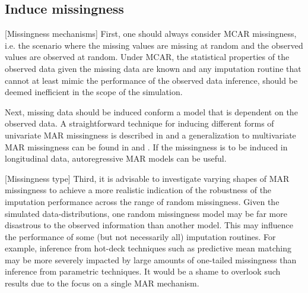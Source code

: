 \documentclass[bimj,fleqn]{w-art}
\theoremstyle{plain}
\theoremstyle{definition}
\begin{document}

\subsection{Induce missingness}


[Missingness mechanisms]
First, one should always consider MCAR missingness, i.e. the scenario where the missing values are missing at random and the observed values are observed at random. Under MCAR, the statistical properties of the observed data given the missing data are known and any imputation routine that cannot at least mimic the performance of the observed data inference, should be deemed inefficient in the scope of the simulation. 

Next, missing data should be induced conform a model that is dependent on the observed data. A straightforward technique for inducing different forms of univariate MAR missingness is described in \citet[][p. 63]{fimd} and a generalization to multivariate MAR missingness can be found in \citet[][Appendix B]{buur06} and \citet[][\S 5.2.3]{brand1999development}. If the missingness is to be induced in longitudinal data, autoregressive MAR models \citep[e.g. cf.][model 2 and model 3]{shara2015randomly} can be useful.

[Missingness type]
Third, it is advisable to investigate varying shapes of MAR missingness to achieve a more realistic indication of the robustness of the imputation performance across the range of random missingness. Given the simulated data-distributions, one random missingness model may be far more disastrous to the observed information than another model. This may influence the performance of some (but not necessarily all) imputation routines. For example, inference from hot-deck techniques such as predictive mean matching \citep{little1988missing, rubin1986statistical} may be more severely impacted by large amounts of one-tailed missingness than inference from parametric techniques. It would be a shame to overlook such results due to the focus on a single MAR mechanism. 
\end{document}
